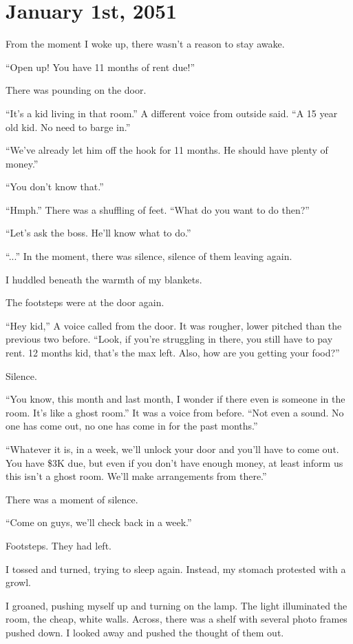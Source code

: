 \section{January 1st, 2051}
From the moment I woke up, there wasn't a reason to stay awake. 

“Open up! You have 11 months of rent due!”

There was pounding on the door.

“It’s a kid living in that room.” A different voice from outside said. “A 15 year old kid. No need to barge in.”

“We’ve already let him off the hook for 11 months. He should have plenty of money.”

“You don’t know that.”

“Hmph.” There was a shuffling of feet. “What do you want to do then?”

“Let’s ask the boss. He’ll know what to do.”

“...” In the moment, there was silence, silence of them leaving again.

I huddled beneath the warmth of my blankets. 

The footsteps were at the door again.

“Hey kid,” A voice called from the door. It was rougher, lower pitched than the previous two before. “Look, if you’re struggling in there, you still have to pay rent. 12 months kid, that’s the max left. Also, how are you getting your food?”

Silence.

“You know, this month and last month, I wonder if there even is someone in the room. It’s like a ghost room.” It was a voice from before. “Not even a sound. No one has come out, no one has come in for the past months.”

“Whatever it is, in a week, we’ll unlock your door and you’ll have to come out. You have \$3K due, but even if you don’t have enough money, at least inform us this isn’t a ghost room. We’ll make arrangements from there.”

There was a moment of silence.

“Come on guys, we’ll check back in a week.”

Footsteps. They had left.

I tossed and turned, trying to sleep again. Instead, my stomach protested with a growl.

I groaned, pushing myself up and turning on the lamp. The light illuminated the room, the cheap, white walls. Across, there was a shelf with several photo frames pushed down. I looked away and pushed the thought of them out.

